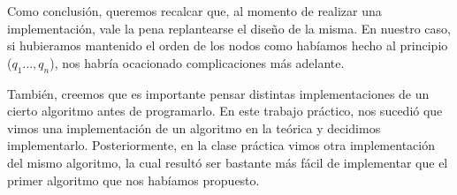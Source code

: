 Como conclusión, queremos recalcar que, al momento de realizar una implementación, vale la pena replantearse el diseño de la misma. En nuestro caso, si hubieramos mantenido el orden de los nodos como habíamos hecho al principio ($q_1 \dots,  q_n$), nos habría ocacionado complicaciones más adelante.

También, creemos que es importante pensar distintas implementaciones de un cierto algoritmo antes de programarlo. En este trabajo práctico, nos sucedió que vimos una implementación de un algoritmo en la teórica y decidimos implementarlo. Posteriormente, en la clase práctica vimos otra implementación del mismo algoritmo, la cual resultó ser bastante más fácil de implementar que el primer algoritmo que nos habíamos propuesto.

